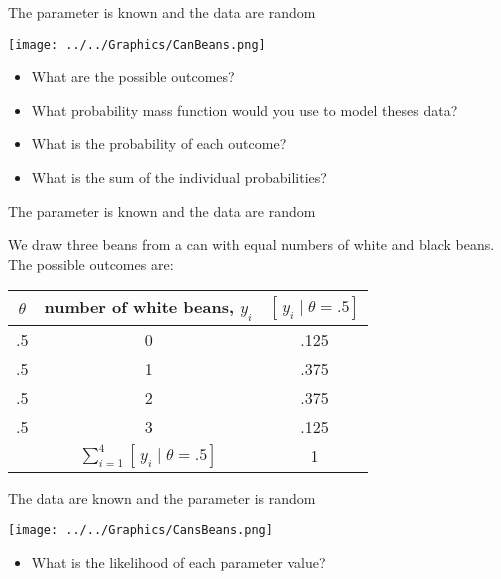\documentclass[ignorenonframetext,]{beamer}
\providecommand{\tightlist}{%
  \setlength{\itemsep}{0pt}\setlength{\parskip}{0pt}}
\begin{document}
\begin{frame}{The parameter is known and the data are random}

\vspace*{1cm}

\centerline{\texttt{[image: ../../Graphics/CanBeans.png]}}

\begin{itemize}
\tightlist
\item
  What are the possible outcomes?
\item
  What probability mass function would you use to model theses data?
\item
  What is the probability of each outcome?
\item
  What is the sum of the individual probabilities?
\end{itemize}

\end{frame}

\begin{frame}{The parameter is known and the data are random}

We draw three beans from a can with equal numbers of white and black
beans. The possible outcomes are:

\bigskip \center

\begin{tabular}{|c|c|c|}
\hline 

$\theta$ & number of white beans, $y_{i}$ & $[\, y_{i} \mid \theta=.5]$\tabularnewline
\hline 
\hline 
.5 & 0 & .125\tabularnewline
\hline 
.5 & 1 & .375\tabularnewline
\hline 
.5 & 2 & .375\tabularnewline
\hline 
.5 & 3 & .125\tabularnewline
\hline 
& $\sum_{i=1}^{4}[\, y_{i} \mid \theta=.5]$ & 1
\tabularnewline
\hline 
\end{tabular}

\end{frame}

\begin{frame}{The data are known and the parameter is random}

\vspace*{1cm}

\centerline{\texttt{[image: ../../Graphics/CansBeans.png]}}

\begin{itemize}
\tightlist
\item
  What is the likelihood of each parameter value?
\end{itemize}

\end{frame}
\end{document}
